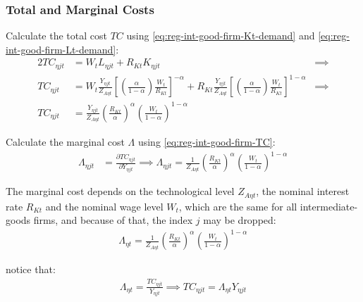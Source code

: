 \documentclass[../thesis.tex]{subfiles}
\begin{document}
\subsubsection*{Total and Marginal Costs}

Calculate the total cost $TC$ using \ref{eq:reg-int-good-firm-Kt-demand} and \ref{eq:reg-int-good-firm-Lt-demand}:
\begin{alignat}{2}
	TC_{\eta jt} & = W_t L_{\eta jt} + R_{Kt} K_{\eta jt} &\implies \nonumber \\
	TC_{\eta jt} & = W_t \frac{Y_{\eta jt}}{Z_{A\eta t}} \left[ \left( \frac{{\alpha_{}}}{1-{\alpha_{}}} \right) \frac{W_t}{R_{Kt}} \right]^{-{\alpha_{}}} + R_{Kt} \frac{Y_{\eta jt}}{Z_{A\eta t}} \left[ \left( \frac{{\alpha_{}}}{1-{\alpha_{}}} \right) \frac{W_t}{R_{Kt}} \right]^{1-{\alpha_{}}} &\implies \nonumber \\
	TC_{\eta jt} & = \frac{Y_{\eta jt}}{Z_{A\eta t}} \left( \frac{R_{Kt}}{{\alpha_{}}} \right)^{{\alpha_{}}} \left( \frac{W_t}{1-{\alpha_{}}} \right)^{1-{\alpha_{}}} \label{eq:reg-int-good-firm-TC}
\end{alignat}


Calculate the marginal cost $\Lambda$ using \ref{eq:reg-int-good-firm-TC}: 
\begin{align}
	\Lambda_{\eta jt} & = \frac{\partial TC_{\eta jt}}{\partial Y_{\eta jt}} \implies 
	\Lambda_{\eta jt} = \frac{1}{Z_{A\eta t}} \left( \frac{R_{Kt}}{{\alpha_{}}} \right)^{{\alpha_{}}} \left( \frac{W_t}{1-{\alpha_{}}} \right)^{1-{\alpha_{}}} \label{eq:reg-int-good-firm-MC}
\end{align}

The marginal cost depends on the technological level $Z_{A\eta t}$, the nominal interest rate $R_{Kt}$ and the nominal wage level $W_t$, which are the same for all intermediate-goods firms, and because of that, the index $j$ may be dropped:
\begin{align}
	\label{eq:reg-int-good-firm-MC-2}
	\Lambda_{\eta t} = \frac{1}{Z_{A\eta t}} \left( \frac{R_{Kt}}{{\alpha_{}}} \right)^{{\alpha_{}}} \left( \frac{W_t}{1-{\alpha_{}}} \right)^{1-{\alpha_{}}}
\end{align}

notice that:
\begin{align}
	\label{eq:reg-int-good-firm-TC-MC}
	\Lambda_{\eta t} = \frac{TC_{\eta jt}}{Y_{\eta jt}} \implies 
	TC_{\eta jt} = \Lambda_{\eta t} Y_{\eta jt}
\end{align}
\end{document}
